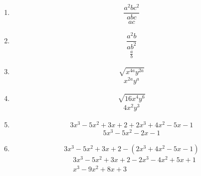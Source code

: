 \documentclass[12pt,letterpaper]{report}
\begin{document}
\begin{enumerate}
\begin{equation*}
        \frac{a^9b^4}{a^6b^3}
    \end{equation*}
    \begin{align*}
        a^3 b
    \end{align*}
\item \begin{equation*}
\frac{a^2bc^2 }{abc}
\end{equation*}
\begin{align*}
        ac
\end{align*}
\item \begin{equation*}
    \frac{a^2b}{ab^2}
\end{equation*}
\begin{align*}
        \frac{a}{b}
\end{align*}
\item \begin{equation*}
    \sqrt{x^{4a}y^{2a}}
\end{equation*}
\begin{align*}
        x^{2a} y^a 
\end{align*}
\item \begin{equation*}
    \sqrt{16x^4y^6}
\end{equation*}
\begin{align*}
        4x^2 y^3
\end{align*}
\item \begin{equation*}
    3x^3-5x^2+3x+2+2x^3+4x^2-5x-1
\end{equation*}
\begin{align*}
        5x^3-5x^2-2x-1
\end{align*}
\item \begin{equation*}
    3x^3-5x^2+3x+2-(2x^3+4x^2-5x-1)
\end{equation*}
\begin{align*}
        &3x^3-5x^2+3x+2-2x^3-4x^2+5x+1\\
        &x^3-9x^2+8x+3
\end{align*}
\end{enumerate}
\end{document}
